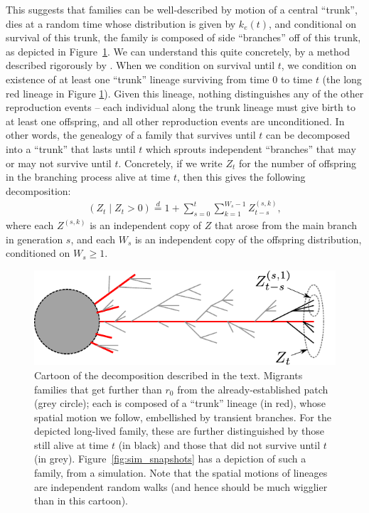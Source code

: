 \documentclass{article}
\renewcommand{\P}{\mathbb{P}}
\newcommand{\deq}{\stackrel{\scriptscriptstyle{d}}{=}}
\begin{document}
This suggests that families can be well-described by motion of a central ``trunk'',
dies at a random time whose distribution is given by $k_e(t)$,
and conditional on survival of this trunk, the family is composed of side ``branches'' off of this trunk,
as depicted in Figure~\ref{fig:branching_decomp}.
We can understand this quite concretely, by a method described rigorously by \citet{geiger1999elementary} \citep[see also][]{chauvin1991growing}.
When we condition on survival until $t$, we condition on existence of
at least one ``trunk'' lineage surviving from time $0$ to time $t$ (the long red
lineage in Figure \ref{fig:branching_decomp}).
Given this lineage, nothing distinguishes any of the other reproduction events --
each individual along the trunk lineage must give birth to at least one offspring,
and all other reproduction events are unconditioned.
In other words, the genealogy of a family that survives until $t$
can be decomposed into a ``trunk'' that lasts until $t$
which sprouts independent ``branches'' that may or may not survive until $t$.
Concretely, if we write $Z_t$ for the number of offspring in the branching process alive at time $t$,
then this gives the following decomposition:
\begin{align}
  \left( Z_t \; \vert \; Z_t>0 \right) \deq 1 + \sum_{s=0}^t \sum_{k=1}^{W_s-1} Z^{(s,k)}_{t-s},
\end{align}
where each $Z^{(s,k)}$ is an independent copy of $Z$ 
that arose from the main branch in generation $s$,
and each $W_s$ is an independent copy of the offspring distribution, conditioned on $W_s \ge 1$.


\begin{figure}[ht!!]
  \begin{center}
    \includegraphics{branching-concept}
  \end{center}
\caption{Cartoon of the decomposition described in the text. 
Migrants families that get further than $r_0$ from the already-established patch (grey circle);
each is composed of a ``trunk'' lineage (in red), whose spatial motion we follow,
embellished by transient branches.
For the depicted long-lived family, these are further distinguished by those still alive at time $t$ (in black)
and those that did not survive until $t$ (in grey).
Figure~\ref{fig:sim_snapshots} has a depiction of such a family, from a simulation. 
Note that the spatial motions of lineages are independent random walks
(and hence should be much wigglier than in this cartoon).
} \label{fig:branching_decomp}
\end{figure}
\end{document}
